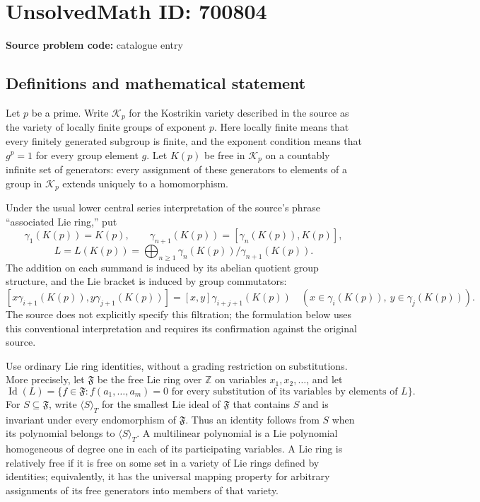 \documentclass[11pt]{article}
\newcommand{\Z}{\mathbb{Z}}
\begin{document}
\section*{UnsolvedMath ID: 700804}
\textbf{Source problem code:} catalogue entry
\subsection{Definitions and mathematical statement}
Let \(p\) be a prime. Write \(\mathcal K_p\) for the Kostrikin variety described in the source as the variety of locally finite groups of exponent \(p\). Here locally finite means that every finitely generated subgroup is finite, and the exponent condition means that \(g^p=1\) for every group element \(g\). Let \(K(p)\) be free in \(\mathcal K_p\) on a countably infinite set of generators: every assignment of these generators to elements of a group in \(\mathcal K_p\) extends uniquely to a homomorphism.

Under the usual lower central series interpretation of the source's phrase ``associated Lie ring,'' put
\[
\gamma_1(K(p))=K(p),\qquad \gamma_{n+1}(K(p))=[\gamma_n(K(p)),K(p)],
\]
\[
L=L(K(p))=\bigoplus_{n\geq 1}\gamma_n(K(p))/\gamma_{n+1}(K(p)).
\]
The addition on each summand is induced by its abelian quotient group structure, and the Lie bracket is induced by group commutators:
\[
[x\gamma_{i+1}(K(p)),y\gamma_{j+1}(K(p))]
=[x,y]\gamma_{i+j+1}(K(p))
\quad(x\in\gamma_i(K(p)),\ y\in\gamma_j(K(p))).
\]
The source does not explicitly specify this filtration; the formulation below uses this conventional interpretation and requires its confirmation against the original source.

Use ordinary Lie ring identities, without a grading restriction on substitutions. More precisely, let \(\mathfrak F\) be the free Lie ring over \(\Z\) on variables \(x_1,x_2,\ldots\), and let
\[
\operatorname{Id}(L)=\{f\in\mathfrak F: f(a_1,\ldots,a_m)=0\text{ for every substitution of its variables by elements of }L\}.
\]
For \(S\subseteq\mathfrak F\), write \(\langle S\rangle_T\) for the smallest Lie ideal of \(\mathfrak F\) that contains \(S\) and is invariant under every endomorphism of \(\mathfrak F\). Thus an identity follows from \(S\) when its polynomial belongs to \(\langle S\rangle_T\). A multilinear polynomial is a Lie polynomial homogeneous of degree one in each of its participating variables. A Lie ring is relatively free if it is free on some set in a variety of Lie rings defined by identities; equivalently, it has the universal mapping property for arbitrary assignments of its free generators into members of that variety.
\end{document}
